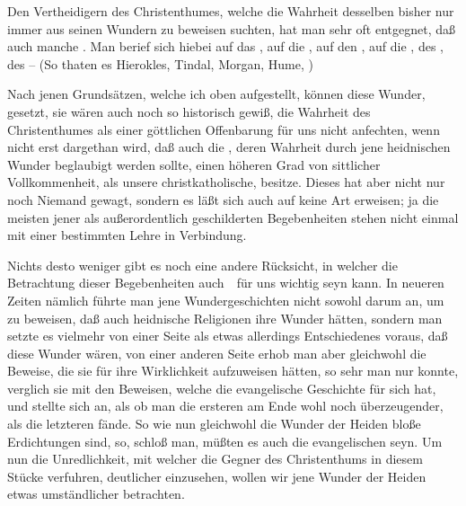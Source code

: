 \begin{aufza}
\item Den Vertheidigern des Christenthumes, welche die Wahrheit desselben bisher nur immer aus seinen Wundern zu beweisen suchten, hat man sehr oft entgegnet, daß auch manche . Man berief sich hiebei auf das , auf die , auf den , auf die , des , des  -- (So thaten es Hierokles, Tindal, Morgan, Hume, \uA )
\item Nach jenen Grundsätzen, welche ich oben aufgestellt, können diese Wunder, gesetzt, sie wären auch noch so historisch gewiß, die Wahrheit des Christenthumes als einer göttlichen Offenbarung für uns nicht anfechten, wenn nicht erst dargethan wird, daß auch die , deren Wahrheit durch jene heidnischen Wunder beglaubigt werden sollte, einen höheren Grad von sittlicher Vollkommenheit, als unsere christkatholische, besitze. Dieses hat aber nicht nur noch Niemand gewagt, sondern es läßt sich auch auf keine Art erweisen; ja die meisten jener als außerordentlich geschilderten Begebenheiten stehen nicht einmal mit einer bestimmten Lehre in Verbindung.
\item Nichts desto weniger gibt es noch eine andere Rücksicht, in welcher die Betrachtung dieser Begebenheiten auch~\ für uns wichtig seyn kann. In neueren Zeiten nämlich führte man jene Wundergeschichten nicht sowohl darum an, um zu beweisen, daß auch heidnische Religionen ihre Wunder hätten, sondern man setzte es vielmehr von einer Seite als etwas allerdings Entschiedenes voraus, daß diese Wunder  wären, von einer anderen Seite erhob man aber gleichwohl die Beweise, die sie für ihre Wirklichkeit aufzuweisen hätten, so sehr man nur konnte, verglich sie mit den Beweisen, welche die evangelische Geschichte für sich hat, und stellte sich an, als ob man die ersteren am Ende wohl noch überzeugender, als die letzteren fände. So wie nun gleichwohl die Wunder der Heiden bloße Erdichtungen sind, so, schloß man, müßten es auch die evangelischen seyn. Um nun die Unredlichkeit, mit welcher die Gegner des Christenthums in diesem Stücke verfuhren, deutlicher einzusehen, wollen wir jene Wunder der Heiden etwas umständlicher betrachten.
\end{aufza}


